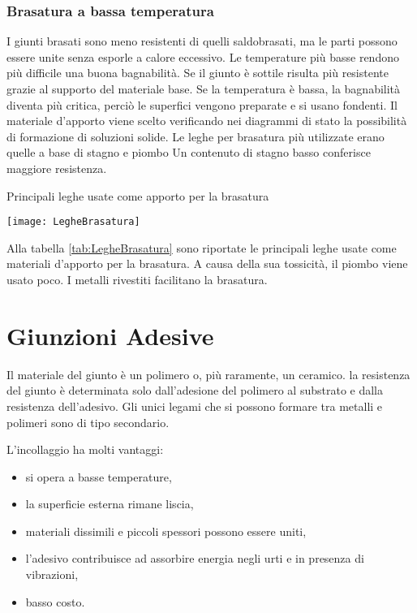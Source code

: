 \subsection{Brasatura a bassa temperatura}
I giunti brasati sono meno resistenti di quelli saldobrasati, ma le parti possono essere unite senza esporle a calore eccessivo.
Le temperature più basse rendono più difficile una buona bagnabilità.
Se il giunto è sottile risulta più resistente grazie al supporto del materiale base.
Se la temperatura è bassa, la bagnabilità diventa più critica, perciò le superfici vengono preparate e si usano fondenti.
Il materiale d'apporto viene scelto verificando nei diagrammi di stato la possibilità di formazione di soluzioni solide.
Le leghe per brasatura più utilizzate erano quelle a base di stagno e piombo
Un contenuto di stagno basso conferisce maggiore resistenza.

\begin{table}
\centering
\caption{Principali leghe usate come apporto per la brasatura}
\label{tab:LegheBrasatura}
\texttt{[image: LegheBrasatura]}
\end{table}

Alla tabella \ref{tab:LegheBrasatura} sono riportate le principali leghe usate come materiali d'apporto per la brasatura.
A causa della sua tossicità, il piombo viene usato poco.
I metalli rivestiti facilitano la brasatura.

\chapter{Giunzioni Adesive}\label{chp:Adesivi}
Il materiale del giunto è un polimero o, più raramente, un ceramico.
la resistenza del giunto è determinata solo dall'adesione del polimero al substrato e dalla resistenza dell'adesivo.
Gli unici legami che si possono formare tra metalli e polimeri sono di tipo secondario.

L'incollaggio ha molti vantaggi:
\begin{itemize}
\item si opera a basse temperature,
\item la superficie esterna rimane liscia,
\item materiali dissimili e piccoli spessori possono essere uniti,
\item  l'adesivo contribuisce ad assorbire energia negli urti e in presenza di vibrazioni,
\item basso costo.
\end{itemize}

